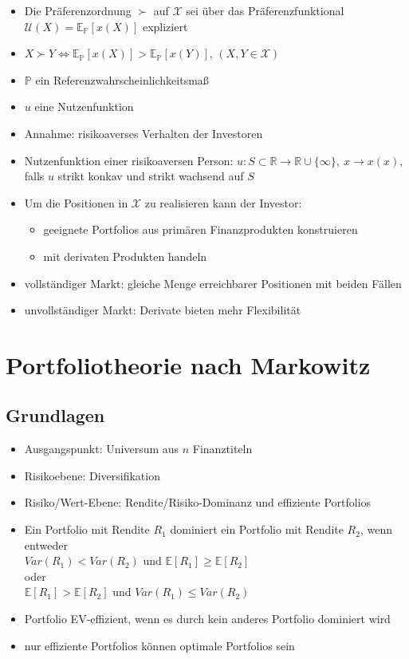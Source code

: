 \documentclass[12pt]{report}
\theoremstyle{dotless}
\theoremstyle{definition}
\begin{document}
\begin{itemize}
	\item Die Pr\"aferenzordnung $\succ$ auf $\mathcal{X}$ sei \"uber das Pr\"aferenzfunktional $\mathcal{U}(X) = \mathbb{E_P}[x(X)]$ expliziert
	\item $X \succ Y \Leftrightarrow \mathbb{E_P}[x(X)] > \mathbb{E_P}[x(Y)]$, $(X,Y \in \mathcal{X})$
	\item $\mathbb{P}$ ein Referenzwahrscheinlichkeitsma{\ss}
	\item $u$ eine Nutzenfunktion
	\item Annahme: risikoaverses Verhalten der Investoren
	\item Nutzenfunktion einer risikoaversen Person: $u:S \subset \mathbb{R} \rightarrow \mathbb{R} \cup \{\infty\}, \ x \rightarrow x(x)$, falls $u$ strikt konkav und strikt wachsend auf $S$
	\item Um die Positionen in $\mathcal{X}$ zu realisieren kann der Investor:
	\begin{itemize}
		\item geeignete Portfolios aus prim\"aren Finanzprodukten konstruieren
		\item mit derivaten Produkten handeln
	\end{itemize}
	\item vollst\"andiger Markt: gleiche Menge erreichbarer Positionen mit beiden F\"allen
	\item unvollst\"andiger Markt: Derivate bieten mehr Flexibilit\"at
\end{itemize}



\section{Portfoliotheorie nach Markowitz}

\subsection{Grundlagen}

\begin{itemize}
	\item Ausgangspunkt: Universum aus $n$ Finanztiteln
	\item Risikoebene: Diversifikation
	\item Risiko/Wert-Ebene: Rendite/Risiko-Dominanz und effiziente Portfolios
	\item Ein Portfolio mit Rendite $R_1$ dominiert ein Portfolio mit Rendite $R_2$, wenn entweder \\ $Var(R_1) < Var(R_2)$ und $\mathbb{E}[R_1] \geq \mathbb{E}[R_2]$ \\ oder \\ $\mathbb{E}[R_1] > \mathbb{E}[R_2]$ und $Var(R_1) \leq Var(R_2)$
	\item Portfolio EV-effizient, wenn es durch kein anderes Portfolio dominiert wird
	\item nur effiziente Portfolios k\"onnen optimale Portfolios sein
\end{itemize}
\end{document}
